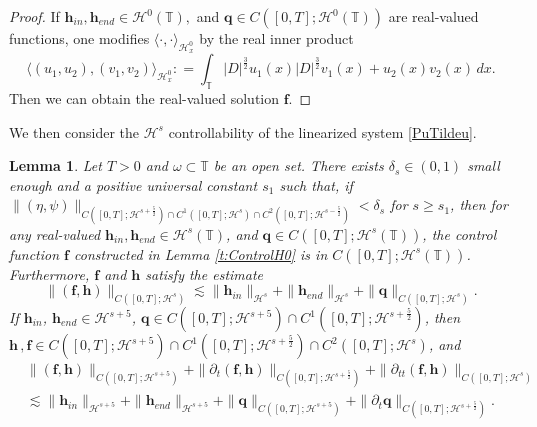 \documentclass[12pt]{amsart}
\newtheorem{lemma}[theorem]{Lemma}
\theoremstyle{remark}
\theoremstyle{definition}
\numberwithin{equation}{section}
\newcommand{\p}{\partial}
\renewcommand{\H}{{\mathcal H }}
\newcommand{\f}{\frac}
\newcommand{\T}{{\mathbb T}}
\newcommand{\mH}{\mathcal{H}}
\begin{document}
\begin{proof}
If $\mathbf{h}_{in}, \mathbf{h}_{end} \in \H^0(\T),$ and $\mathbf{q}\in C([0,T]; \H^0(\T))$ are real-valued functions, one  modifies $\langle   \cdot,  \cdot\rangle_{\H^0_x}$ by the real inner product
\begin{equation*}
\langle  (u_1, u_2),  (v_1, v_2)\rangle_{\H^0_x} : = \int_\T |D|^\f32 u_1(x) |D|^\f32v_1(x) + u_2(x)v_2(x) \,dx.
\end{equation*}
Then we can obtain the real-valued solution $\mathbf{f}$.
\end{proof}

We then consider the $\H^s$ controllability of the linearized system \eqref{PuTildeu}.
\begin{lemma}\label{t:ControlHs}
Let $T>0$ and $\omega \subset \T$ be an open set. 
There exists $\delta_s\in (0,1)$ small enough and a positive universal constant $s_1$ such that, if $\| (\eta, \psi)\|_{C([0,T]; \H^{s+\f52})\cap C^1([0,T]; \H^{s})\cap C^2([0,T]; \H^{s-\f52})}<\delta_s$ for $s\geq s_1$, then for any real-valued $\mathbf{h}_{in}, \mathbf{h}_{end} \in \H^s(\T)$, and $\mathbf{q}\in C([0,T]; \H^s(\T))$, the control function $\mathbf{f}$ constructed in Lemma \ref{t:ControlH0} is in $C([0,T]; \H^s(\T))$.
Furthermore, $\mathbf{f}$ and  $\mathbf{h}$ satisfy the estimate
\begin{equation*}
 \|(\mathbf{f},\mathbf{h})\|_{C([0,T]; \H^s)} \lesssim \|\mathbf{h}_{in}\|_{\H^s} + \|\mathbf{h}_{end}\|_{\H^s} + \|\mathbf{q}\|_{C([0,T]; \H^s)}.
\end{equation*}
If $\mathbf{h}_{in}$, $\mathbf{h}_{end}\in\mH^{s+5}$, $\mathbf{q}\in C([0,T];\mH^{s+5})\cap C^1([0,T];\mH^{s+\f52})$, then $\mathbf{h}\,,\mathbf{f}\in C([0,T]; \H^{s+5})\cap C^1([0,T]; \H^{s+\frac{5}{2}})\cap C^2([0,T]; \H^{s}) $, and
\begin{align*}
&\|(\mathbf{f},\mathbf{h})\|_{C([0,T]; \H^{s+5})} + \|\p_t(\mathbf{f},\mathbf{h})\|_{C([0,T]; \H^{s+\f52})} +\|\p_{tt}(\mathbf{f},\mathbf{h})\|_{C([0,T]; \H^{s})}\\
&\lesssim \|\mathbf{h}_{in}\|_{\H^{s+5}} + \|\mathbf{h}_{end}\|_{\H^{s+5}} + \|\mathbf{q}\|_{C([0,T]; \H^{s+5})}+\|\p_t\mathbf{q}\|_{C([0,T]; \H^{s+\f52})}.
\end{align*}
\end{lemma}
\end{document}
